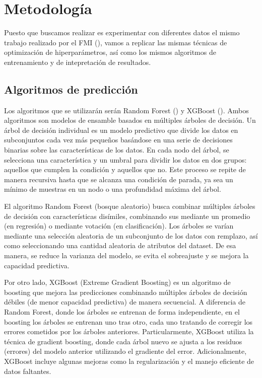 \documentclass{article}
\begin{document}
\section{Metodología}
Puesto que buscamos realizar es experimentar con diferentes datos el mismo 
trabajo realizado por el FMI (\cite{Ceb24}), vamos a replicar las mismas 
técnicas de optimización de hiperparámetros, así como los mismos algoritmos
de entrenamiento y de intepretación de resultados.

\subsection{Algoritmos de predicción}
Los algoritmos que se utilizarán serán Random Forest (\cite{Bre01}) y XGBoost
(\cite{Che16}). Ambos algoritmos son modelos de ensamble basados en múltiples 
árboles de decisión. Un árbol de decisión individual es un modelo predictivo que divide 
los datos en subconjuntos cada vez más pequeños basándose en una serie de decisiones 
binarias sobre las características de los datos. En cada nodo del árbol, se selecciona una 
característica y un umbral para dividir los datos en dos grupos: aquellos que cumplen 
la condición y aquellos que no. Este proceso se repite de manera recursiva hasta que se 
alcanza una condición de parada, ya sea un mínimo de muestras en un nodo o una 
profundidad máxima del árbol.

El algoritmo Random Forest (bosque aleatorio) busca combinar 
múltiples árboles de decisión con características disímiles, combinando sus 
mediante un promedio (en regresión) o mediante votación (en clasificación). 
Los árboles se varían mediante una selección aleatoria de un subconjunto de los datos con 
remplazo, así como seleccionando una cantidad aleatoria
de atributos del dataset. De esa manera, se reduce la varianza del modelo, se evita el
sobreajuste y se mejora la capacidad predictiva.

Por otro lado, XGBoost (Extreme Gradient Boosting) es un algoritmo de boosting que mejora 
las predicciones combinando múltiples árboles de decisión débiles (de menor capacidad 
predictiva) de manera secuencial. A diferencia de Random Forest, donde los árboles se 
entrenan de  forma independiente, en el boosting los árboles se entrenan uno tras otro, 
cada uno tratando de corregir los errores cometidos por los árboles anteriores. 
Particularmente, XGBoost utiliza la técnica de gradient boosting, donde cada árbol nuevo 
se ajusta a los residuos (errores) del modelo anterior utilizando el gradiente del error. 
Adicionalmente, XGBoost incluye algunas mejoras como la regularización
y el manejo eficiente de datos faltantes. 
\end{document}
